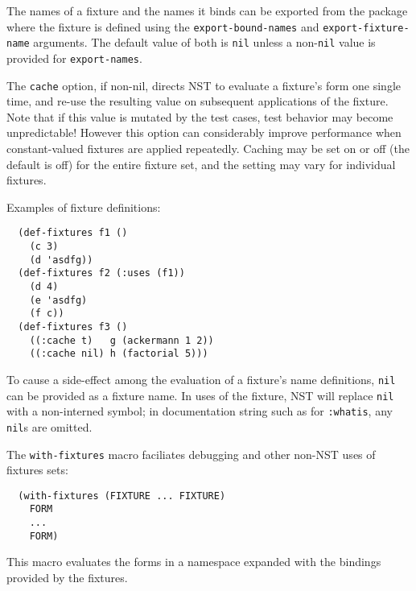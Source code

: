 The names of a fixture and the names it binds can be exported from the
package where the fixture is defined using the
\texttt{export-bound-names} and \texttt{export-fixture-name}
arguments.  The default value of both is \texttt{nil} unless a
non-\texttt{nil} value is provided for \texttt{export-names}.

The \texttt{cache} option, if non-nil, directs NST to evaluate a
fixture's form one single time, and re-use the resulting value on
subsequent applications of the fixture.  Note that if this value is
mutated by the test cases, test behavior may become unpredictable!
However this option can considerably improve performance when
constant-valued fixtures are applied repeatedly.  Caching may be set
on or off (the default is off) for the entire fixture set, and the
setting may vary for individual fixtures.

Examples of fixture definitions:
\begin{verbatim}
  (def-fixtures f1 ()
    (c 3)
    (d 'asdfg))
  (def-fixtures f2 (:uses (f1))
    (d 4)
    (e 'asdfg)
    (f c))
  (def-fixtures f3 ()
    ((:cache t)   g (ackermann 1 2))
    ((:cache nil) h (factorial 5)))
\end{verbatim}

To cause a side-effect among the evaluation of a fixture's name
definitions, \texttt{nil} can be provided as a fixture name.  In uses
of the fixture, NST will replace \texttt{nil} with a non-interned
symbol; in documentation string such as for \texttt{:whatis}, any
\texttt{nil}s are omitted.

The \texttt{with-fixtures} macro faciliates debugging and other
non-NST uses of fixtures sets:
\begin{verbatim}
  (with-fixtures (FIXTURE ... FIXTURE)
    FORM
    ...
    FORM)
\end{verbatim}
This macro evaluates the forms in a namespace expanded with the
bindings provided by the fixtures.


